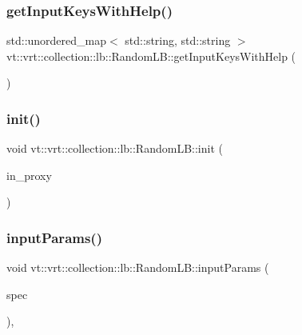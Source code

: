\subsubsection{\texorpdfstring{get\+Input\+Keys\+With\+Help()}{getInputKeysWithHelp()}}
{\footnotesize\ttfamily std\+::unordered\+\_\+map$<$ std\+::string, std\+::string $>$ vt\+::vrt\+::collection\+::lb\+::\+Random\+L\+B\+::get\+Input\+Keys\+With\+Help (\begin{DoxyParamCaption}{ }\end{DoxyParamCaption})\hspace{0.3cm}{\ttfamily [static]}}

\mbox{\label{structvt_1_1vrt_1_1collection_1_1lb_1_1_random_l_b_a1b9a24043e9a971fc3acb47233028ca8}} 
\subsubsection{\texorpdfstring{init()}{init()}}
{\footnotesize\ttfamily void vt\+::vrt\+::collection\+::lb\+::\+Random\+L\+B\+::init (\begin{DoxyParamCaption}\item[{\hyperlink{structvt_1_1objgroup_1_1proxy_1_1_proxy}{objgroup\+::proxy\+::\+Proxy}$<$ \hyperlink{structvt_1_1vrt_1_1collection_1_1lb_1_1_random_l_b}{Random\+LB} $>$}]{in\+\_\+proxy }\end{DoxyParamCaption})}

\mbox{\label{structvt_1_1vrt_1_1collection_1_1lb_1_1_random_l_b_ae0269a00daa9a3111742d9ea35f5a542}} 
\subsubsection{\texorpdfstring{input\+Params()}{inputParams()}}
{\footnotesize\ttfamily void vt\+::vrt\+::collection\+::lb\+::\+Random\+L\+B\+::input\+Params (\begin{DoxyParamCaption}\item[{\hyperlink{structvt_1_1vrt_1_1collection_1_1balance_1_1_spec_entry}{balance\+::\+Spec\+Entry} $\ast$}]{spec }\end{DoxyParamCaption})\hspace{0.3cm}{\ttfamily [override]}, {\ttfamily [virtual]}}



